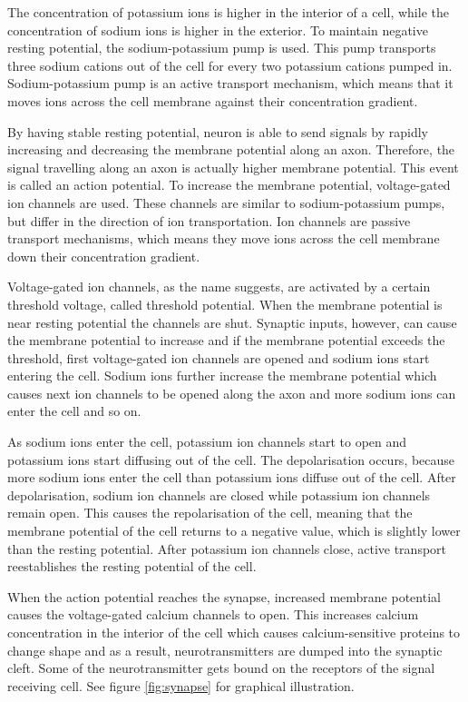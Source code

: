 The concentration of potassium ions is higher in the interior of a cell, while the concentration of sodium ions is higher in the exterior. To maintain negative resting potential, the sodium-potassium pump is used. This pump transports three sodium cations out of the cell for every two potassium cations pumped in. Sodium-potassium pump is an active transport mechanism, which means that it moves ions across the cell membrane against their concentration gradient.

By having stable resting potential, neuron is able to send signals by rapidly increasing and decreasing the membrane potential along an axon. Therefore, the signal travelling along an axon is actually higher membrane potential. This event is called an action potential. To increase the membrane potential, voltage-gated ion channels are used. These channels are similar to sodium-potassium pumps, but differ in the direction of ion transportation. Ion channels are passive transport mechanisms, which means they move ions across the cell membrane down their concentration gradient.

Voltage-gated ion channels, as the name suggests, are activated by a certain threshold voltage, called threshold potential. When the membrane potential is near resting potential the channels are shut. Synaptic inputs, however, can cause the membrane potential to increase and if the membrane potential exceeds the threshold, first voltage-gated ion channels are opened and sodium ions start entering the cell. Sodium ions further increase the membrane potential which causes next ion channels to be opened along the axon and more sodium ions can enter the cell and so on.

As sodium ions enter the cell, potassium ion channels start to open and potassium ions start diffusing out of the cell. The depolarisation occurs, because more sodium ions enter the cell than potassium ions diffuse out of the cell. After depolarisation, sodium ion channels are closed while potassium ion channels remain open. This causes the repolarisation of the cell, meaning that the membrane potential of the cell returns to a negative value, which is slightly lower than the resting potential. After potassium ion channels close, active transport reestablishes the resting potential of the cell.

When the action potential reaches the synapse, increased membrane potential causes the voltage-gated calcium channels to open. This increases calcium concentration in the interior of the cell which causes calcium-sensitive proteins to change shape and as a result, neurotransmitters are dumped into the synaptic cleft. Some of the neurotransmitter gets bound on the receptors of the signal receiving cell. See figure \ref{fig:synapse} for graphical illustration.

